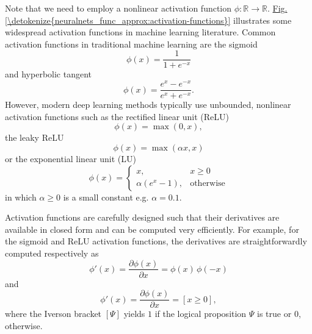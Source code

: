 \documentclass[letterpaper,10pt,english]{jupyterBook}
\begin{document}
\sphinxAtStartPar
Note that we need to employ a non\sphinxhyphen{}linear activation function \(\phi \colon \mathbb{R} \rightarrow \mathbb{R} \). \hyperref[\detokenize{neuralnets_func_approx:activation-functions}]{Fig.\@ \ref{\detokenize{neuralnets_func_approx:activation-functions}}} illustrates some widespread activation functions in machine learning literature. Common activation functions in traditional machine learning are the sigmoid
\label{equation:neuralnets_func_approx:75248184-94a3-4def-b69b-a02c1a966be9}\begin{equation}
\phi(x) = \frac{1}{1+e^{-x}}
\end{equation}
\sphinxAtStartPar
and hyperbolic tangent
\label{equation:neuralnets_func_approx:f00c718e-5eb6-4b43-b7ce-c70a2e9519d3}\begin{equation}
\phi(x) = \frac{e^{x}-e^{-x}}{e^{x}+e^{-x}}.
\end{equation}
\sphinxAtStartPar
However, modern deep learning methods typically use unbounded, non\sphinxhyphen{}linear activation functions such as the rectified linear unit (ReLU)
\label{equation:neuralnets_func_approx:6d7fc53c-5b8f-41e2-9915-9082940be875}\begin{equation}
\phi(x) = \max(0, x),
\end{equation}
\sphinxAtStartPar
the leaky ReLU
\label{equation:neuralnets_func_approx:9d9a6c56-5123-4b2f-96c7-9914565af7b5}\begin{equation}
\phi(x) = \max(\alpha x, x)
\end{equation}
\sphinxAtStartPar
or the exponential linear unit (LU)
\label{equation:neuralnets_func_approx:e8239ac6-6721-40bf-858e-96dcde4e286f}\begin{equation}
\phi(x) = \left\lbrace 
\begin{matrix}
x, & x \geq 0 \\
\alpha \left( e^{x}-1 \right), & \mbox{otherwise}
\end{matrix}
\right.
\end{equation}
\sphinxAtStartPar
in which \( \alpha \geq 0 \) is a small constant e.g. \( \alpha = 0.1 \).

\sphinxAtStartPar
Activation functions are carefully designed such that their derivatives are available in closed form and can be computed very efficiently. For example, for the sigmoid and ReLU activation functions, the derivatives are straightforwardly computed respectively as
\label{equation:neuralnets_func_approx:ec8bd5b2-4409-42f0-a8d9-363f52084e8d}\begin{equation}
\phi'(x) =  \frac{\partial \phi(x)}{\partial x} =  \phi(x) \, \phi(-x)
\end{equation}
\sphinxAtStartPar
and
\label{equation:neuralnets_func_approx:49ca0e92-c4d0-44bd-92ad-0fd115fea0e9}\begin{equation}
\phi'(x) =  \frac{\partial \phi(x)}{\partial x} =  \left[ x \geq 0 \right],
\end{equation}
\sphinxAtStartPar
where the Iverson bracket \( \left[ \Psi \right] \) yields \( 1 \) if the logical proposition \( \Psi \) is true or \( 0 \), otherwise.
\end{document}
